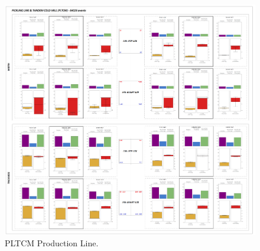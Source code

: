 \begin{landscape}
	\begin{figure}[ht]
		\centering
		\includegraphics[width=1.1\textwidth]{../images/supplements-PLTCM_real_life_events_analysis-results.png}
		\caption{PLTCM Production Line.}
		\label{figure-supplements-PLTCM}
	\end{figure}
\end{landscape}